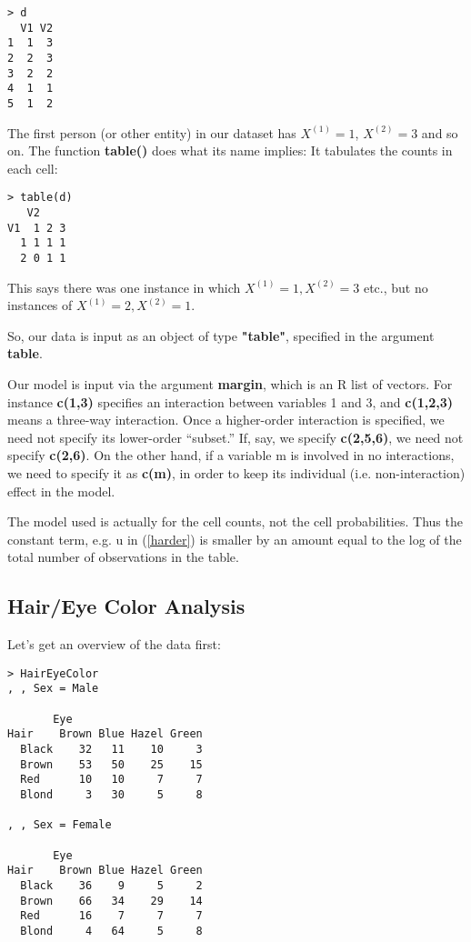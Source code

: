 \begin{Verbatim}[fontsize=\relsize{-2}]
> d
  V1 V2
1  1  3
2  2  3
3  2  2
4  1  1
5  1  2
\end{Verbatim}

The first person (or other entity) in our dataset has $X^{(1)} = 1$, 
$X^{(2)} = 3$ and so on.  The function {\bf table()} does what its name
implies:  It tabulates the counts in each cell:

\begin{lstlisting}
> table(d)
   V2
V1  1 2 3
  1 1 1 1
  2 0 1 1
\end{lstlisting}

This says there was one instance in which $X^{(1)} = 1, X^{(2)} = 3$
etc., but no instances of $X^{(1)} = 2, X^{(2)} = 1$. 

So, our data is input as an object of type {\bf "table"}, specified in
the argument {\bf table}.  

Our model is input via the argument {\bf margin}, which is an R list of
vectors.  For instance {\bf c(1,3)} specifies an interaction between
variables 1 and 3, and {\bf c(1,2,3)} means a three-way interaction.
Once a higher-order interaction is specified, we need not specify its
lower-order ``subset.''  If, say, we specify {\bf c(2,5,6)}, we need not
specify {\bf c(2,6)}.  On the other hand, if a variable m is involved in
no interactions, we need to specify it as {\bf c(m)}, in order to keep
its individual (i.e. non-interaction) effect in the model.

The model used is actually for the cell counts, not the cell
probabilities.  Thus the constant term, e.g. u in (\ref{harder}) is
smaller by an amount equal to the log of the total number of
observations in the table.

\subsection{Hair/Eye Color Analysis}

Let's get an overview of the data first:

\begin{lstlisting}
> HairEyeColor
, , Sex = Male

       Eye
Hair    Brown Blue Hazel Green
  Black    32   11    10     3
  Brown    53   50    25    15
  Red      10   10     7     7
  Blond     3   30     5     8

, , Sex = Female

       Eye
Hair    Brown Blue Hazel Green
  Black    36    9     5     2
  Brown    66   34    29    14
  Red      16    7     7     7
  Blond     4   64     5     8
\end{lstlisting}

